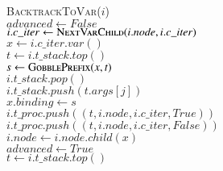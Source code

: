   \begin{quotex}
  \q {}
  \qq \textsc{BacktrackToVar}($i$)
  \\[\jot]
  \q $\mathit{advanced} \gets \mathit{False}$ \\
  \q {}
  \qq {}
  \qqq $i.\mathit{c\_iter} \gets \textsc{NextVarChild}(i.\mathit{node}, i.\mathit{c\_iter})$ \\
  \qqq {}
  \qqqq $x \gets i.\mathit{c\_iter}.\mathit{var}()$ \\
  \qqqq $t \gets i.\mathit{t\_stack}.\mathit{top}()$ \\
  \qqqq $\mathit{s} \gets \textsc{GobblePrefix}(x, t)$ \\
  \qqqq {}
  \qqqqq $i.\mathit{t\_stack}.\mathit{pop}()$ \\
  \qqqqq {}
  \qqqqqq $i.\mathit{t\_stack}.\mathit{push}(t.\mathit{args}[j])$ \\
  \qqqqq {}
  \qqqqqq $x.\mathit{binding} \gets \mathit{s}$ \\
  \qqqqqq $i.\mathit{t\_proc}.\mathit{push}
                      ( (t, i.\mathit{node}, i.\mathit{c\_iter}, \mathit{True} ) )$ \\
  \qqqqq \MyElse
  \qqqqqq $i.\mathit{t\_proc}.\mathit{push}
                      ( (t, i.\mathit{node}, i.\mathit{c\_iter}, \mathit{False}) )$
  \\[\jot]
  \qqqqq $ \mathit{i.\mathit{node}} \gets i.\mathit{node}.child(x)$ \\
  \qqqqq $ \mathit{advanced} \gets \mathit{True}$
  \\[\jot]
  \qq $t \gets i.\mathit{t\_stack}.\mathit{top}()$ \\
  \qq {}

\end{quotex}
